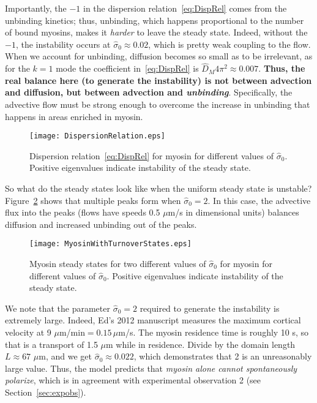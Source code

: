 \documentclass[11pt]{article}
\newcommand{\6}[1]{#1_{\text{6}}}
\newcommand{\3}[1]{#1_{\text{3}}}
\begin{document}
Importantly, the $-1$ in the dispersion relation\ \eqref{eq:DispRel} comes from the unbinding kinetics; thus, unbinding, which happens proportional to the number of bound myosins, makes it \emph{harder} to leave the steady state. Indeed, without the $-1$, the instability occurs at $\hat{\sigma}_0 \approx 0.02$, which is pretty weak coupling to the flow. When we account for unbinding, diffusion becomes so small as to be irrelevant, as for the $k=1$ mode the coefficient in\ \eqref{eq:DispRel} is $\hat{D}_M 4 \pi^2 \approx 0.007$. \textbf{Thus, the real balance here (to generate the instability) is not between advection and diffusion, but between advection and \emph{unbinding}}. Specifically, the advective flow must be strong enough to overcome the increase in unbinding that happens in areas enriched in myosin.

\begin{figure}
\centering
\texttt{[image: DispersionRelation.eps]}
\caption{\label{fig:DispRelMy}Dispersion relation\ \eqref{eq:DispRel} for myosin for different values of $\hat{\sigma}_0$. Positive eigenvalues indicate instability of the steady state.}
\end{figure}

So what do the steady states look like when the uniform steady state is unstable? Figure\ \ref{fig:MyosinTSS} shows that multiple peaks form when $\hat{\sigma}_0=2$. In this case, the advective flux into the peaks (flows have speeds 0.5 $\mu$m/s in dimensional units) balances diffusion and increased unbinding out of the peaks. 

\begin{figure}
\centering
\texttt{[image: MyosinWithTurnoverStates.eps]}
\caption{\label{fig:MyosinTSS}Myosin steady states for two different values of $\hat{\sigma}_0$  for myosin for different values of $\hat{\sigma}_0$. Positive eigenvalues indicate instability of the steady state.}
\end{figure}

We note that the parameter $\hat{\sigma}_0=2$ required to generate the instability is extremely large. Indeed, Ed's 2012 manuscript measures the maximum cortical velocity at 9 $\mu$m/min$= 0.15 \, \mu$m/s. The myosin residence time is roughly 10 s, so that is a transport of 1.5 $\mu$m while in residence. Divide by the domain length $L \approx 67$ $\mu$m, and we get $\hat{\sigma}_0 \approx 0.022$, which demonstrates that 2 is an unreasonably large value. Thus, the model predicts that \emph{myosin alone cannot spontaneously polarize}, which is in agreement with experimental observation 2 (see Section\ \ref{sec:expobs}).
\end{document}

